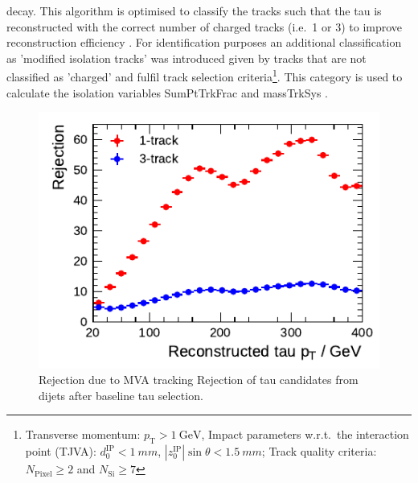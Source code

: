 decay. This algorithm is optimised to classify the tracks such that the tau is
reconstructed with the correct number of charged tracks (i.e.\ 1 or 3) to
improve reconstruction efficiency . For identification purposes an additional
classification as 'modified isolation tracks' was introduced given by tracks
that are not classified as 'charged' and fulfil track selection
criteria\footnote{Transverse momentum:
  $p_\mathrm{T} > \SI{1}{\giga\electronvolt}$, Impact parameters w.r.t.\ the
  interaction point (TJVA): $d_0^\text{IP} < \SI{1}{mm}$,
  $|z_0^\text{IP}| \sin\theta < \SI{1.5}{mm}$; Track quality criteria:
  $N_\text{Pixel} \geq 2$ and $N_\text{Si} \geq 7$}. This category is used to
calculate the isolation variables SumPtTrkFrac and massTrkSys .

%
%
%
%
%

\begin{figure}[ht]
  \centering
  \includegraphics{./figures/bdt_perf/mva_tracking_rejection.pdf}
  \caption{Rejection due to MVA tracking 
    Rejection of tau candidates from dijets after baseline tau selection.}
  \label{fig:mva_tracking_rejection}
\end{figure}

